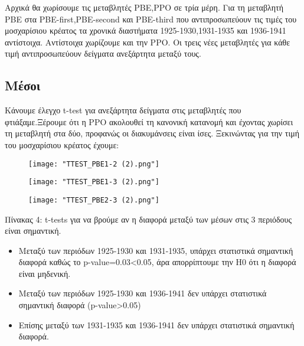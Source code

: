 \documentclass[10pt]{article}
\begin{document}
Αρχικά θα χωρίσουμε τις μεταβλητές PBE,PPO σε τρία μέρη. Για τη μεταβλητή PBE στα PBE-first,PBE-second και PBE-third που αντιπροσωπεύουν τις τιμές του μοσχαρίσιου κρέατος τα χρονικά διαστήματα 1925-1930,1931-1935 και 1936-1941 αντίστοιχα. Αντίστοιχα χωρίζουμε και την PPO. Οι τρεις νέες μεταβλητές για κάθε τιμή αντιπροσωπεύουν δείγματα ανεξάρτητα μεταξύ τους.


\subsection{Μέσοι}
Κάνουμε έλεγχο t-test για ανεξάρτητα δείγματα στις μεταβλητές που φτιάξαμε.Ξέρουμε ότι η PPO ακολουθεί τη κανονική κατανομή και έχοντας χωρίσει τη μεταβλητή στα δύο, προφανώς οι διακυμάνσεις είναι ίσες. Ξεκινώντας για την τιμή του μοσχαρίσιου κρέατος έχουμε:

\begin{figure}[H]
    \centering
    \texttt{[image: "TTEST\_PBE1-2 (2).png"]}
    
    \label{fig:galaxy}
\end{figure}

\begin{figure}[H]
    \centering
    \texttt{[image: "TTEST\_PBE1-3 (2).png"]}
    
    \label{fig:galaxy}
\end{figure}

\begin{figure}[H]
    \centering
    \texttt{[image: "TTEST\_PBE2-3 (2).png"]}
    
    \label{fig:galaxy}
\end{figure}

\begin{centering}


\renewcommand{\caption}{Πίνακας 4: }
\caption { t-tests για να βρούμε αν η διαφορά μεταξύ των μέσων στις 3 περιόδους είναι σημαντική. }
\end{centering}

\begin{itemize}
    \item Μεταξύ των περιόδων 1925-1930 και 1931-1935, υπάρχει στατιστικά σημαντική διαφορά καθώς το p-value=0.03<0.05, άρα απορρίπτουμε την Η0 ότι η διαφορά είναι μηδενική.
    \item Μεταξύ των περιόδων 1925-1930 και 1936-1941 δεν υπάρχει στατιστικά σημαντική διαφορά (p-value>0.05)
    \item Επίσης μεταξύ των 1931-1935 και 1936-1941 δεν υπάρχει στατιστικά σημαντική διαφορά.
\end{itemize}
\end{document}

